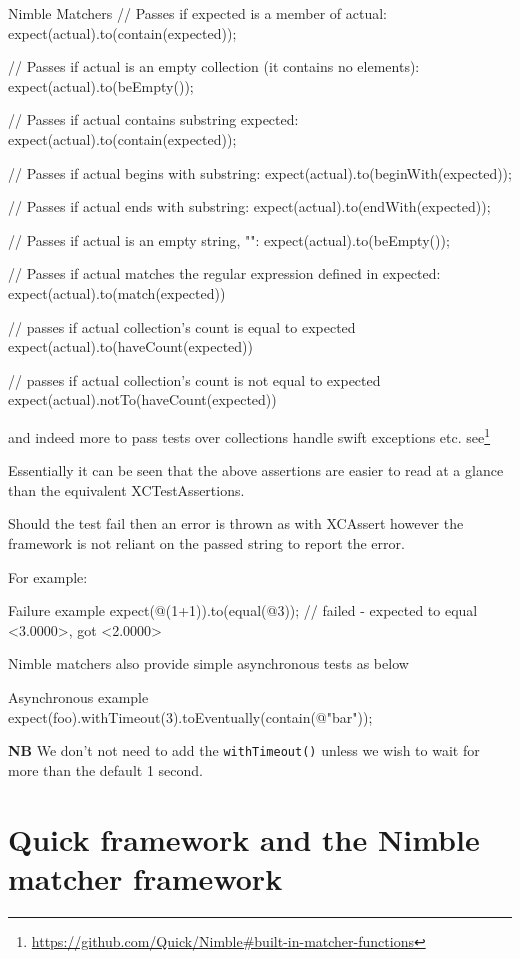 \documentclass[a4paper, titlepage]{article}
\begin{document}
\begin{listbox}{1}{Nimble Matchers}
// Passes if expected is a member of actual:
expect(actual).to(contain(expected));

// Passes if actual is an empty collection (it contains no elements):
expect(actual).to(beEmpty());

// Passes if actual contains substring expected:
expect(actual).to(contain(expected));

// Passes if actual begins with substring:
expect(actual).to(beginWith(expected));

// Passes if actual ends with substring:
expect(actual).to(endWith(expected));

// Passes if actual is an empty string, "":
expect(actual).to(beEmpty());

// Passes if actual matches the regular expression defined in expected:
expect(actual).to(match(expected))

// passes if actual collection's count is equal to expected
expect(actual).to(haveCount(expected))

// passes if actual collection's count is not equal to expected
expect(actual).notTo(haveCount(expected))
\end{listbox}

and indeed more to pass tests over collections handle swift exceptions
etc. see\footnote{\url{https://github.com/Quick/Nimble#built-in-matcher-functions}} 

Essentially it can be seen that the above assertions are easier to
read at a glance than the equivalent XCTestAssertions.

Should the test fail then an error is thrown as with XCAssert however
the framework is not reliant on the passed string to report the error.

For example:

\begin{listbox}{1}{Failure example}
expect(@(1+1)).to(equal(@3));
// failed - expected to equal <3.0000>, got <2.0000>
\end{listbox}

Nimble matchers also provide simple asynchronous tests as below

\begin{listbox}{1}{Asynchronous example}
expect(foo).withTimeout(3).toEventually(contain(@"bar"));
\end{listbox}

\textbf{NB} We don't not need to add the \texttt{withTimeout()} unless we wish to wait
for more than the default 1 second.

\section{Quick framework and the Nimble matcher framework}
\end{document}
